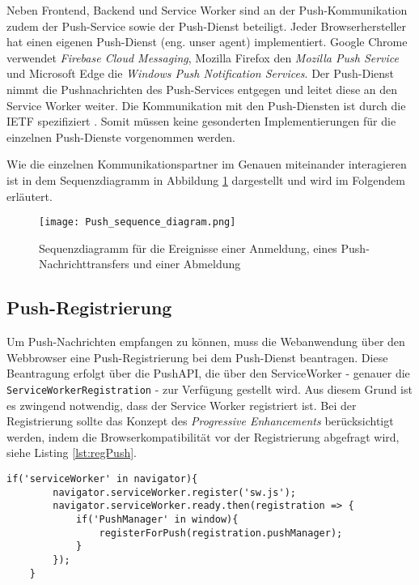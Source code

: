 Neben Frontend, Backend und Service Worker sind an der Push-Kommunikation zudem der Push-Service sowie der Push-Dienst beteiligt. Jeder Browserhersteller hat einen eigenen Push-Dienst (eng. unser agent) implementiert. Google Chrome verwendet \textit{Firebase Cloud Messaging}, Mozilla Firefox den \textit{Mozilla Push Service} und Microsoft Edge die \textit{Windows Push Notification Services}. Der Push-Dienst nimmt die Pushnachrichten des Push-Services entgegen und leitet diese an den Service Worker weiter. Die Kommunikation mit den Push-Diensten ist durch die \ac{IETF} spezifiziert \cite{rfc8030}. Somit müssen keine gesonderten Implementierungen für die einzelnen Push-Dienste vorgenommen werden. 

Wie die einzelnen Kommunikationspartner im Genauen miteinander interagieren ist in dem Sequenzdiagramm in Abbildung \ref{img:sequenceDiagram} dargestellt und wird im Folgendem erläutert. 

\newpage
\begin{figure}[!htb]
    \centering
    \texttt{[image: Push\_sequence\_diagram.png]}
    \caption{Sequenzdiagramm für die Ereignisse einer Anmeldung, eines Push-Nachrichttransfers und einer Abmeldung \cite{PushW3}}
    \label{img:sequenceDiagram}
\end{figure}
\newpage


\subsection{Push-Registrierung}\label{sec:pushRegistrirung}

Um Push-Nachrichten empfangen zu können, muss die Webanwendung über den Webbrowser eine Push-Registrierung bei dem Push-Dienst beantragen. Diese Beantragung erfolgt über die PushAPI, die über den ServiceWorker - genauer die \texttt{ServiceWorkerRegistration} - zur Verfügung gestellt wird. Aus diesem Grund ist es zwingend notwendig, dass der Service Worker registriert ist. 
Bei der Registrierung sollte das Konzept des \textit{Progressive Enhancements} berücksichtigt werden, indem die Browserkompatibilität vor der Registrierung abgefragt wird, siehe Listing \ref{lst:regPush}. 

\begin{lstlisting}[caption={Push-Registrierung unter Berücksichtigung der Konzepte des Progressive Enhancements}, label={lst:regPush}, float={!htb}]
    if('serviceWorker' in navigator){
        navigator.serviceWorker.register('sw.js');
        navigator.serviceWorker.ready.then(registration => {
            if('PushManager' in window){
                registerForPush(registration.pushManager);
            }
        });
    }
\end{lstlisting}




